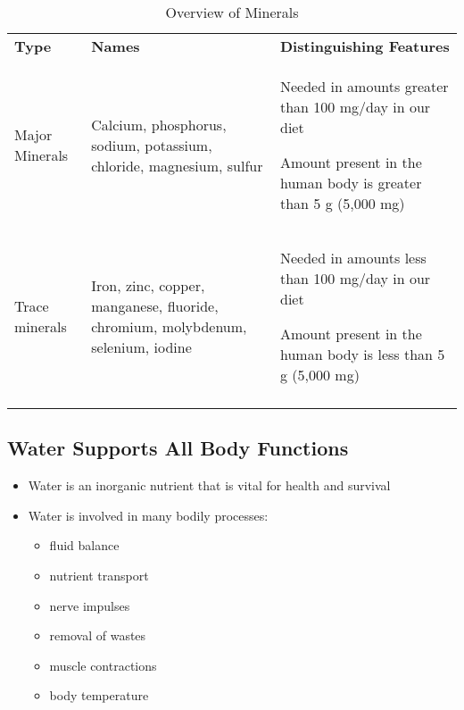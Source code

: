 \documentclass[title={Chapter 1}]{fdsn201notes}
\begin{document}
\begin{table}[H]
	\centering
	\caption{Overview of Minerals}
	\label{tab:mineral-overview}
	\begin{tabular}{p{} p{} p{}}
		\rowcolor{rowdarkgreen}\textbf{Type} & \textbf{Names} & \textbf{Distinguishing Features}\\
		Major Minerals & Calcium, phosphorus, sodium, potassium, chloride, magnesium, sulfur & Needed in amounts greater than 100 mg/day in our diet

		Amount present in the human body is greater than 5 g (5,000 mg)\\
		Trace minerals & Iron, zinc, copper, manganese, fluoride, chromium, molybdenum, selenium, iodine & Needed in amounts less than 100 mg/day in our diet

		Amount present in the human body is less than 5 g (5,000 mg)\\
		\rowcolor{rowdarkgreen} & & \\
	\end{tabular}
\end{table}

\subsection{Water Supports All Body Functions}\label{subsec:water-supports-all-body-functions}
\begin{itemize}
	\item Water is an inorganic nutrient that is vital for health and survival
	\item Water is involved in many bodily processes:
	\begin{itemize}
		\item fluid balance
		\item nutrient transport
		\item nerve impulses
		\item removal of wastes
		\item muscle contractions
		\item body temperature
	\end{itemize}
\end{itemize}
\end{document}
